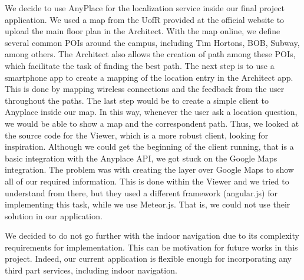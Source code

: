 We decide to use AnyPlace for the localization service inside our final project application.
We used a map from the UofR provided at the official website to upload the main floor plan in the Architect.
With the map online, we define several common POIs around the campus, including Tim Hortons, BOB, Subway, among others.
The Architect also allows the creation of path among these POIs, which facilitate the task of finding the best path.
The next step is to use a smartphone app to create a mapping of the location entry in the Architect app.
This is done by mapping wireless connections and the feedback from the user throughout the paths.
The last step would be to create a simple client to Anyplace inside our map.
In this way, whenever the user ask a location question, we would be able to show a map and the correspondent path.
Thus, we looked at the source code for the Viewer, which is a more robust client, looking for inspiration.
Although we could get the beginning of the client running, that is a basic integration with the Anyplace API, we got stuck on the Google Maps integration.
The problem was with creating the layer over Google Maps to show all of our required information.
This is done within the Viewer and we tried to understand from there, but they used a different framework (angular.js) for implementing this task, while we use Meteor.js.
That is, we could not use their solution in our application.

We decided to do not go further with the indoor navigation due to its complexity requirements for implementation.
This can be motivation for future works in this project.
Indeed, our current application is flexible enough for incorporating any third part services, including indoor navigation.